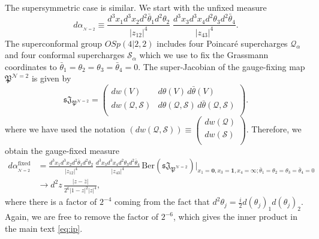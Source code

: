 \documentclass[11pt]{article}
\newcommand{\thetab}{\bar{\theta}}
\newcommand{\zb}{\bar{z}}
\begin{document}
The supersymmetric case is similar. We start with the unfixed measure
%
\begin{equation}\label{eq:superunfixedmeas}
d\alpha_{_{\mathcal{N}=2}}  \equiv 
\frac{d^{3}x_{1}d^{3}x_{2}d^{2}\thetab_{1}d^{2}\theta_{2}}{|z_{12}|^{4}} \; \frac{d^{3}x_{3}d^{3}x_{4}d^{2}\theta_{3}d^{2}\thetab_{4}}{|z_{43}|^{4}}.
\end{equation}
%
The superconformal group $OSp(4|2,2)$ includes four Poincar\'e supercharges $\mathcal{Q}_{\alpha}$ and four conformal supercharges $\mathcal{S}_{\alpha}$ which we use to fix the Grassmann coordinates to $\thetab_{1} = \theta_{2} = \theta_{3} = \thetab_{4} = 0$. The super-Jacobian of the gauge-fixing map $\mathfrak{P}^{\mathcal{N}=2}$ is given by
%
\begin{equation}\label{eq:superJ}
\mathfrak{s}\mathfrak{J}_{\mathfrak{P}^{\mathcal{N}=2}} = 
				\left(\begin{array}{c|c}
				dw(V) & d\theta(V) \, d\thetab(V) \\
				\hline
				dw(\mathcal{Q},\mathcal{S}) & d\theta(\mathcal{Q},\mathcal{S}) \, d\thetab(\mathcal{Q},\mathcal{S}) \\
				\end{array}\right).
\end{equation}
%
where we have used the notation $\left( dw(\mathcal{Q},\mathcal{S}) \right) \equiv \left(\begin{matrix} dw(\mathcal{Q}) \\ dw(\mathcal{S}) \\ \end{matrix} \right)$.
Therefore, we obtain the gauge-fixed measure
%
\begin{equation}\label{eq:supergaugefixmeas}
\begin{split}
d\alpha_{_{\mathcal{N}=2}}^{\mathrm{fixed}} 
&= 
	\frac{d^{3}x_{1}d^{3}x_{2}d^{2}\thetab_{1}d^{2}\theta_{2}}{|z_{12}|^{4}}\, 
	\frac{d^{3}x_{3}d^{3}x_{4}d^{2}\theta_{3}d^{2}\thetab_{4}}{|z_{43}|^{4}} \,
	\mathrm{Ber}(\mathfrak{s}\mathfrak{J}_{\mathfrak{P}^{\mathcal{N}=2}})
	\bigg|_{x_{1} = \mathbf{0}, x_{3} = \mathbf{1}, x_{4} = \infty;\thetab_{1} = \theta_{2} = \theta_{3} = \thetab_{4} = 0} \\
	&\to d^{2}z\,\frac{|z-\zb|}{2^{6}|1-z|^{2}|z|^{4}},
\end{split}
\end{equation}
%
where there is a factor of $2^{-4}$ coming from the fact that $d^{2}\theta_{j} = \frac{i}{2}d(\theta_{j})_{1}d(\theta_{j})_{2}$. Again, we are free to remove the factor of $2^{-6}$, which gives the inner product in the main text \eqref{eq:ip}.

 




%  
% 

 

\end{document}
